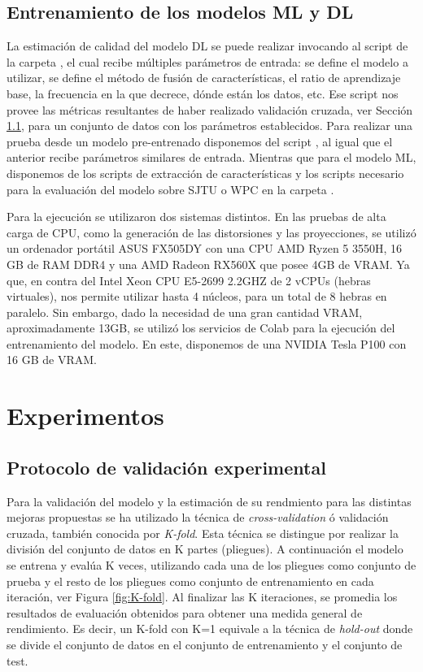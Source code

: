 \subsection{Entrenamiento de los modelos ML y DL} 
\label{sec:TrainML}
La estimación de calidad del modelo DL se puede realizar invocando al script  de la carpeta ,
el cual recibe múltiples parámetros de entrada: se define el modelo a utilizar, 
se define el método de fusión de características, el ratio de aprendizaje base,
la frecuencia en la que decrece, dónde están los datos, etc. Ese script nos 
provee las métricas resultantes de haber realizado validación cruzada, 
ver Sección \ref{sec:Validation}, 
para un conjunto de datos con los parámetros establecidos. 
Para realizar una prueba desde un modelo pre-entrenado disponemos del script 
, al igual que el anterior recibe parámetros similares de entrada.
Mientras que para el modelo ML, disponemos de los scripts de extracción 
de características y los scripts necesario para la evaluación del 
modelo sobre SJTU\cite{SJTU} o WPC\cite{WPC1, WPC2} en la carpeta .

Para la ejecución se utilizaron dos sistemas distintos. En las pruebas de alta 
carga de CPU, como la generación de las distorsiones y las proyecciones, 
se utilizó un ordenador portátil ASUS FX505DY con una CPU AMD Ryzen 5 
3550H, 16 GB de RAM DDR4 y una AMD Radeon RX560X que posee 4GB de VRAM. Ya 
que, en contra del Intel Xeon CPU E5-2699 2.2GHZ de 2 vCPUs (hebras virtuales), 
nos permite utilizar hasta 4 núcleos, para un total de 8 hebras en paralelo. 
Sin embargo, dado la necesidad de una gran cantidad VRAM, aproximadamente 13GB, 
se utilizó los servicios de Colab para la ejecución del entrenamiento del modelo. 
En este, disponemos de una NVIDIA Tesla P100 con 16 GB de VRAM.  

\section{Experimentos} 
\subsection{Protocolo de validación experimental} 
\label{sec:Validation}
Para la validación del modelo y la estimación de su rendmiento para las distintas 
mejoras propuestas se ha utilizado la técnica de \emph{cross-validation} ó 
validación cruzada, también conocida por \emph{K-fold}. 
Esta técnica se distingue por realizar la división del conjunto de datos 
en K partes (pliegues). A continuación el modelo se entrena y evalúa K veces, utilizando 
cada una de los pliegues como conjunto de prueba y el resto de los pliegues como 
conjunto de entrenamiento en cada iteración, ver Figura \ref{fig:K-fold}. 
Al finalizar las K iteraciones, se promedia los resultados de evaluación 
obtenidos para obtener una medida general de rendimiento. 
Es decir, un K-fold con K=1 equivale a la técnica de \emph{hold-out} 
donde se divide el conjunto de datos en el conjunto de entrenamiento y 
el conjunto de test.  

